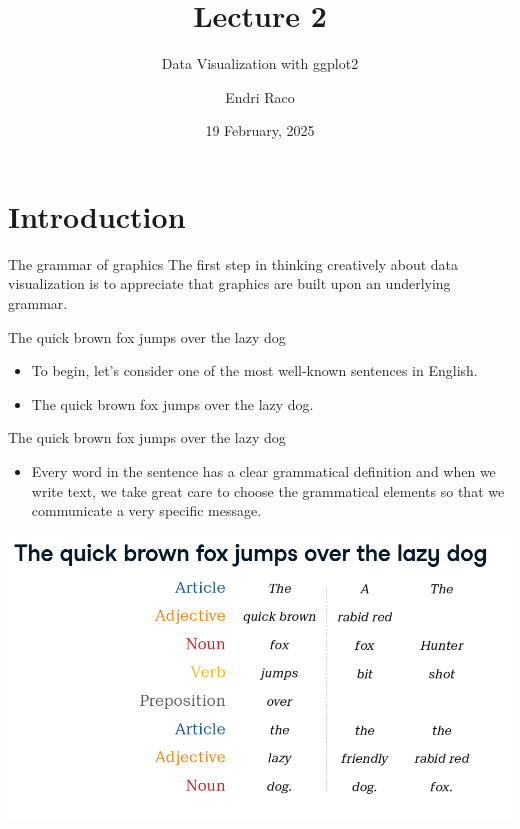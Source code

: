 \documentclass[
  ignorenonframetext,
]{beamer}
\title{Lecture 2}
\subtitle{Data Visualization with ggplot2}
\author{Endri Raco}
\date{19 February, 2025}
\providecommand{\tightlist}{%
  \setlength{\itemsep}{0pt}\setlength{\parskip}{0pt}}
\begin{document}
\frame{\titlepage}

\begin{frame}[allowframebreaks]
  \tableofcontents[hideallsubsections]
\end{frame}
\section{Introduction}\label{introduction}

\begin{frame}{The grammar of graphics}
\label{the-grammar-of-graphics}
The first step in thinking creatively about data visualization is to
appreciate that graphics are built upon an underlying grammar.
\end{frame}

\begin{frame}{The quick brown fox jumps over the lazy dog}
\label{the-quick-brown-fox-jumps-over-the-lazy-dog}
\begin{itemize}
\item
  To begin, let's consider one of the most well-known sentences in
  English.
\item
  The quick brown fox jumps over the lazy dog.
\end{itemize}
\end{frame}

\begin{frame}{The quick brown fox jumps over the lazy dog}
\label{the-quick-brown-fox-jumps-over-the-lazy-dog-1}
\begin{itemize}
\tightlist
\item
  Every word in the sentence has a clear grammatical definition and when
  we write text, we take great care to choose the grammatical elements
  so that we communicate a very specific message.
\end{itemize}

\includegraphics{../images/im120.png}
\end{frame}
\end{document}
